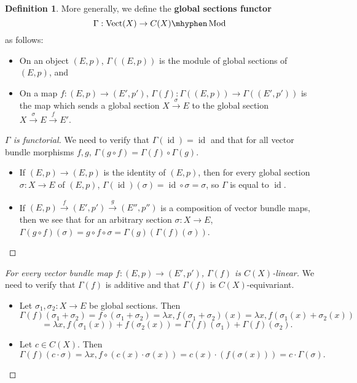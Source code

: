 \documentclass[11pt]{article}
\newcommand{\Vect}{\operatorname{Vect}}
\newcommand{\Mod}{\mhyphen\operatorname{Mod}}
\newcommand{\id}{\operatorname{id}}
\theoremstyle{plain}
\theoremstyle{definition}
\newtheorem{definition}{Definition}[section]
\begin{document}
\begin{definition}\label{def:global-sections-functor}
  More generally, we define the \textbf{global sections functor}
  \[\Gamma : \Vect(X) \to C(X)\Mod\]
  as follows:
  \begin{itemize}
  \item On an object \((E,p)\), \(\Gamma((E,p))\) is the module of global sections of \((E,p)\), and
    \item On a map \(f : (E,p) \to (E',p')\), \(\Gamma(f) : \Gamma((E,p)) \to \Gamma((E',p'))\) is the map which sends a global section \(X \overset{\sigma}{\to} E\) to the global section \(X \overset{\sigma}{\to} E \overset{f}{\to} E'\).
    \end{itemize}

    \begin{proof}[\(\Gamma\) is functorial]
      We need to verify that \(\Gamma(\id) = \id\) and that for all vector bundle morphisms \(f,g\), \(\Gamma(g \circ f) = \Gamma(f) \circ \Gamma(g)\).
      \begin{itemize}
      \item If \((E,p) \to (E,p)\) is the identity of \((E,p)\), then for every global section \(\sigma : X \to E\) of \((E,p)\), \(\Gamma(\id)(\sigma) = \id \circ \sigma = \sigma\), so \(\Gamma\) is equal to \(\id\).

        \item If \((E,p) \overset{f}{\to} (E',p') \overset{g}{\to} (E'', p'')\) is a composition of vector bundle maps, then we see that for an arbitrary section \(\sigma : X \to E\), \(\Gamma(g \circ f)(\sigma) = g \circ f \circ \sigma = \Gamma(g)(\Gamma(f)(\sigma))\).
      \end{itemize}
    \end{proof}

    \begin{proof}[For every vector bundle map \(f : (E,p) \to (E',p')\), \(\Gamma(f)\) is \(C(X)\)-linear]
      We need to verify that \(\Gamma(f)\) is additive and that \(\Gamma(f)\) is \(C(X)\)-equivariant.
      \begin{itemize}
      \item Let \(\sigma_1, \sigma_2 : X \to E\) be global sections. Then
        \[\Gamma(f)(\sigma_1 + \sigma_2) = f \circ (\sigma_1 + \sigma_2) = \lambda x, f(\sigma_1 + \sigma_2)(x) = \lambda x, f(\sigma_1(x) + \sigma_2(x))\]\[ = \lambda x, f(\sigma_1(x)) + f(\sigma_2(x)) = \Gamma(f)(\sigma_1) + \Gamma(f)(\sigma_2).\]
        \item Let \(c \in C(X)\). Then \[\Gamma(f)(c \cdot \sigma) = \lambda x, f \circ (c(x) \cdot \sigma(x)) = c(x) \cdot (f(\sigma(x))) = c \cdot \Gamma(\sigma).\]
      \end{itemize}
    \end{proof}
  
\end{definition}
\end{document}
